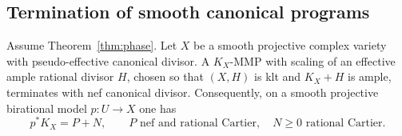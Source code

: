 \subsection{Termination of smooth canonical programs}

\begin{proposition}\label{prop:smooth-termination}
Assume Theorem~\ref{thm:phase}.  Let $X$ be a smooth projective complex
variety with pseudo-effective canonical divisor.  A $K_X$-MMP with scaling
of an effective ample rational divisor $H$, chosen so that $(X,H)$ is klt
and $K_X+H$ is ample, terminates with nef canonical divisor.
Consequently, on a smooth projective birational model $p:U\to X$ one has
\[
 p^*K_X=P+N,
 \qquad P\text{ nef and rational Cartier},\quad N\geq0
 \text{ rational Cartier}.
\]
\end{proposition}

